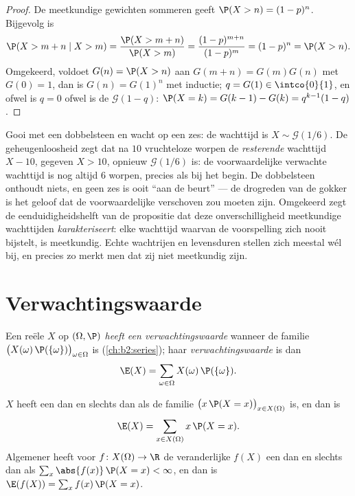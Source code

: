 \begin{proof}
De meetkundige gewichten sommeren geeft $\P(X > n) = (1-p)^n$.
Bijgevolg is
\[
\P(X > m + n \mid X > m)
= \frac{\P(X > m + n)}{\P(X > m)}
= \frac{(1-p)^{m+n}}{(1-p)^m} = (1-p)^n = \P(X > n).
\]
Omgekeerd, voldoet $G(n) = \P(X > n)$ aan $G(m + n) = G(m)G(n)$ met
$G(0) = 1$, dan is $G(n) = G(1)^n$ met inductie; $q = G(1) \in
\intco{0}{1}$, en ofwel is $q = 0$ ofwel is de 
$\mathcal{G}(1 - q)$: $\P(X = k) = G(k-1) - G(k) = q^{k-1}(1 -
q)$.
\end{proof}

\begin{example}
Gooi met een dobbelsteen en wacht op een zes: de wachttijd is $X
\sim \mathcal G(1/6)$. De geheugenloosheid zegt dat na $10$
vruchteloze worpen de \emph{resterende} wachttijd $X - 10$, gegeven
$X > 10$, opnieuw $\mathcal G(1/6)$ is: de voorwaardelijke
verwachte wachttijd is nog altijd $6$ worpen, precies als bij het
begin. De dobbelsteen onthoudt niets, en geen zes is ooit ``aan de
beurt'' --- de drogreden van de gokker is het geloof dat de
voorwaardelijke  verschoven zou moeten zijn. Omgekeerd
zegt de eenduidigheidshelft van de propositie dat deze
onverschilligheid meetkundige wachttijden \emph{karakteriseert}:
elke wachttijd waarvan de voorspelling zich nooit bijstelt, is
meetkundig. Echte wachtrijen en levensduren stellen zich meestal
wél bij, en precies zo merkt men dat zij niet meetkundig zijn.
\end{example}

\section{Verwachtingswaarde}

\begin{definition}[Verwachtingswaarde]\label{def:b2:randomvar:expectation}
Een reële  $X$ op $(\Omega, \P)$ \emph{heeft
een verwachtingswaarde} wanneer de familie
$\bigl(X(\omega)\,\P(\{\omega\})\bigr)_{\omega \in \Omega}$
 is (\cref{ch:b2:series}); haar
\emph{verwachtingswaarde} is dan
\[
\E(X) = \sum_{\omega \in \Omega} X(\omega)\,\P(\{\omega\}) .
\]
\end{definition}

\begin{theorem}[Overdrachtsstelling]\label{thm:b2:randomvar:transfer}
$X$ heeft een  dan en slechts dan als de familie
$\bigl(x\,\P(X = x)\bigr)_{x \in X(\Omega)}$  is, en dan
is
\[
\E(X) = \sum_{x \in X(\Omega)} x\,\P(X = x) .
\]
Algemener heeft voor $f \colon X(\Omega) \to \R$ de veranderlijke
$f(X)$ een  dan en slechts dan als $\sum_x
\abs{f(x)}\,\P(X = x) < \infty$, en dan is $\E(f(X)) = \sum_x
f(x)\,\P(X = x)$.
\end{theorem}

